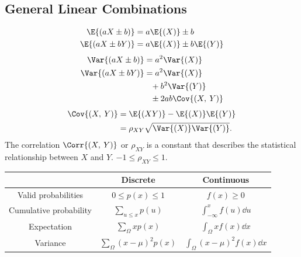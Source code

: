 \documentclass{article}
\begin{document}
\begin{minipage}{126.1962963mm}
\begin{multicols}{2}
        \subsection*{General Linear Combinations}
        \begin{align*}
            \E{\left( aX\pm b \right)}  & = a\E{\left( X \right)} \pm b                     \\
            \E{\left( aX\pm bY \right)} & = a\E{\left( X \right)} \pm b\E{\left( Y \right)}
        \end{align*}
        \begin{align*}
            \Var{\left( aX\pm b \right)}  & = a^2\Var{\left( X \right)}                    \\
            \Var{\left( aX\pm bY \right)} & = a^2\Var{\left( X \right)}                    \\
                                          & \phantom{=} + b^2\Var{\left( Y \right)}        \\
                                          & \phantom{=} \pm 2ab\Cov{\left( X,\: Y \right)}
        \end{align*}
        \begin{align*}
            \Cov{\left( X,\: Y \right)} & = \E{\left( XY \right)} - \E{\left( X \right)}\E{\left( Y \right)} \\
                                        & = \rho_{XY} \sqrt{\Var{\left( X \right)}\Var{\left( Y \right)}}.
        \end{align*}
        The correlation \(\Corr{\left( X,\: Y \right)}\) or \(\rho_{XY}\) is a constant that describes the statistical relationship
        between \(X\) and \(Y\). \(-1 \leq \rho_{XY} \leq 1\).
    \end{multicols}
    \begin{table}[H]
        \centering
        \begin{tabular}{c c c}
            \toprule
                                   & \textbf{Discrete}                            & \textbf{Continuous}                                \\
            \midrule
            Valid probabilities    & \(0 \leq p(x) \leq 1\)                         & \(f(x) \geq 0\)                                      \\
            Cumulative probability & \(\sum_{u \leq x} p(u)\)                       & \(\int_{-\infty}^{x} f(u) \dd{u}\)                   \\
            Expectation            & \(\sum_{\Omega} xp(x)\)                        & \(\int_{\Omega} xf(x)\dd{x}\)                        \\
            Variance               & \(\sum_{\Omega} \left( x - \mu \right)^2p(x)\) & \(\int_{\Omega} \left( x - \mu \right)^2f(x)\dd{x}\) \\
            \bottomrule
        \end{tabular}
    \end{table}
\end{minipage}\hfill%
\end{document}
